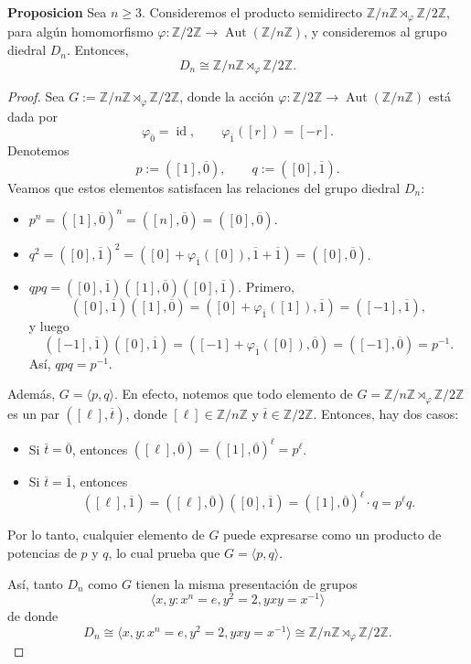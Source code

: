 \noindent \textbf{Proposicion}
	\upshape
	Sea \( n \geq 3 \). Consideremos el producto semidirecto \( \mathbb{Z}/n\mathbb{Z} \rtimes_{\varphi} \mathbb{Z}/2\mathbb{Z} \), para algún homomorfismo \( \varphi: \mathbb{Z}/2\mathbb{Z} \to \operatorname{Aut}(\mathbb{Z}/n\mathbb{Z}) \), y consideremos al grupo diedral $D_n$. Entonces,
	\[
	D_n \cong \mathbb{Z}/n\mathbb{Z} \rtimes_{\varphi} \mathbb{Z}/2\mathbb{Z}.
	\]


\begin{proof}
	Sea \(G := \mathbb{Z}/n\mathbb{Z} \rtimes_\varphi \mathbb{Z}/2\mathbb{Z}\), donde la acción \(\varphi: \mathbb{Z}/2\mathbb{Z} \to \operatorname{Aut}(\mathbb{Z}/n\mathbb{Z})\) está dada por
	\[
	\varphi_{\overline{0}} = \operatorname{id}, \qquad \varphi_{\overline{1}}([r]) = [-r].
	\]
	Denotemos
	\[
	p := ([1], \overline{0}), \qquad q := ([0], \overline{1}).
	\]
	Veamos que estos elementos satisfacen las relaciones del grupo diedral \(D_n\):
	
	\begin{itemize}
		\item \(p^n = ([1], \overline{0})^n = ([n], \overline{0}) = ([0], \overline{0})\).
		
		\item \(q^2 = ([0], \overline{1})^2 = ([0] + \varphi_{\overline{1}}([0]), \overline{1} + \overline{1}) = ([0], \overline{0})\).
		
		\item \(q p q = ([0], \overline{1})([1], \overline{0})([0], \overline{1})\). Primero,
		\[
		([0], \overline{1})([1], \overline{0}) = ([0] + \varphi_{\overline{1}}([1]), \overline{1}) = ([-1], \overline{1}),
		\]
		y luego
		\[
		([-1], \overline{1})([0], \overline{1}) = ([-1] + \varphi_{\overline{1}}([0]), \overline{0}) = ([-1], \overline{0}) = p^{-1}.
		\]
		Así, \(q p q = p^{-1}\).
	\end{itemize}
	Además, \(G = \langle p, q \rangle\). En efecto, notemos que todo elemento de \(G = \mathbb{Z}/n\mathbb{Z} \rtimes_\varphi \mathbb{Z}/2\mathbb{Z}\) es un par \(([\ell], \overline{t})\), donde \([\ell] \in \mathbb{Z}/n\mathbb{Z}\) y \(\overline{t} \in \mathbb{Z}/2\mathbb{Z}\). Entonces, hay dos casos:
	
	\begin{itemize}
		\item Si \(\overline{t} = \overline{0}\), entonces \(([\ell], \overline{0}) = ([1], \overline{0})^\ell = p^\ell\).
		
		\item Si \(\overline{t} = \overline{1}\), entonces
		\[
		([\ell], \overline{1}) = ([\ell], \overline{0})([0], \overline{1}) = ([1], \overline{0})^\ell \cdot q = p^\ell q.
		\]
	\end{itemize}
	Por lo tanto, cualquier elemento de \(G\) puede expresarse como un producto de potencias de \(p\) y \(q\), lo cual prueba que \(G = \langle p, q \rangle\).
	
	
	\medskip
	\noindent Así,  tanto $D_n$ como $G$ tienen la misma presentación de grupos $$\langle x,y: x^n=e,y^2=2,yxy=x^{-1}\rangle$$ de donde 
	\[
	D_n \cong \langle x,y: x^n=e,y^2=2,yxy=x^{-1}\rangle \cong\mathbb{Z}/n\mathbb{Z} \rtimes_\varphi \mathbb{Z}/2\mathbb{Z}. 
	\]
\end{proof}


